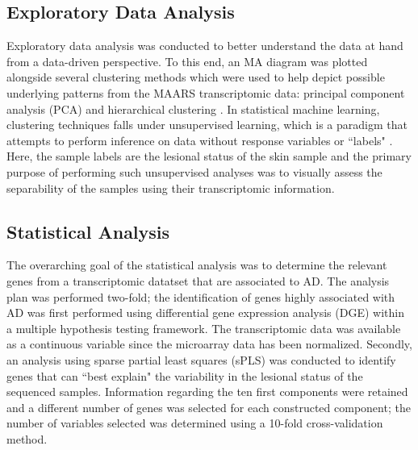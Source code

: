 \documentclass[journal, a4paper]{IEEEtran}
\begin{document}
\subsection{\textbf{Exploratory Data Analysis}}

Exploratory data analysis was conducted to better understand the data at hand from a data-driven perspective. To this end, an MA diagram was plotted alongside several clustering methods which were used to help depict possible underlying patterns from the MAARS transcriptomic data: principal component analysis (PCA) and hierarchical clustering \cite{maaten2008visualizing, friedman2001elements}. In statistical machine learning, clustering techniques falls under unsupervised learning, which is a paradigm that attempts to perform inference on data without response variables or ``labels" \cite{friedman2001elements}. Here, the sample labels are the lesional status of the skin sample and the primary purpose of performing such unsupervised analyses was to visually assess the separability of the samples using their transcriptomic information.

\subsection{\textbf{Statistical Analysis}}


The overarching goal of the statistical analysis was to determine the relevant genes from a transcriptomic datatset that are associated to AD. The analysis plan was performed two-fold; the identification of genes highly associated with AD was first performed using differential gene expression analysis (DGE) within a multiple hypothesis testing framework. The transcriptomic data was available as a continuous variable since the microarray data has been normalized. Secondly, an analysis using sparse partial least squares (sPLS) was conducted to identify genes that can ``best explain" the variability in the lesional status of the sequenced samples. Information regarding the ten first components were retained and a different number of genes was selected for each constructed component; the number of variables selected was determined using a 10-fold cross-validation method.\\
\end{document}
